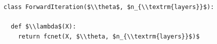\documentclass[border=10pt]{standalone}
\begin{document}
\begin{lstlisting}
class ForwardIteration($\\theta$, $n_{\\textrm{layers}}$):

  def $\\lambda$(X):
    return fcnet(X, $\\theta, $n_{\\textrm{layers}}$)$
\end{lstlisting}
\end{document}
